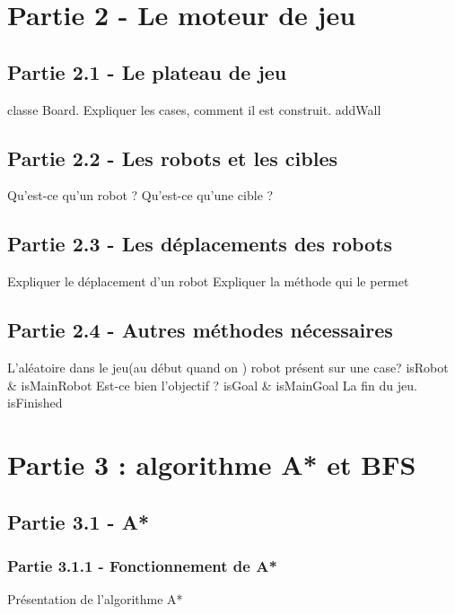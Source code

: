 \documentclass{beamer} %
\begin{document}
\section{Partie 2 - Le moteur de jeu}
	\subsection{Partie 2.1 - Le plateau de jeu}
\begin{frame}[plain]
classe Board. Expliquer les cases, 
comment il est construit. addWall
\end{frame}
	\subsection{Partie 2.2 - Les robots et les cibles}
\begin{frame}[plain]
Qu'est-ce qu'un robot ? %
Qu'est-ce qu'une cible ? %
\end{frame}
	\subsection{Partie 2.3 - Les déplacements des robots}
\begin{frame}[plain]
Expliquer le déplacement d'un robot
Expliquer la méthode qui le permet
\end{frame}
	\subsection{Partie 2.4 - Autres méthodes nécessaires}
\begin{frame}[plain]
L'aléatoire dans le jeu(au début quand on )
robot présent sur une case? isRobot \& isMainRobot
Est-ce bien l'objectif ? isGoal \& isMainGoal
La fin du jeu. isFinished
\end{frame}



\section{Partie 3 : algorithme A* et BFS}
	\subsection{Partie 3.1 - A*}
		\subsubsection{Partie 3.1.1 - Fonctionnement de A*}
\begin{frame}[plain]
Présentation de l'algorithme A*
\end{frame}
\end{document}

